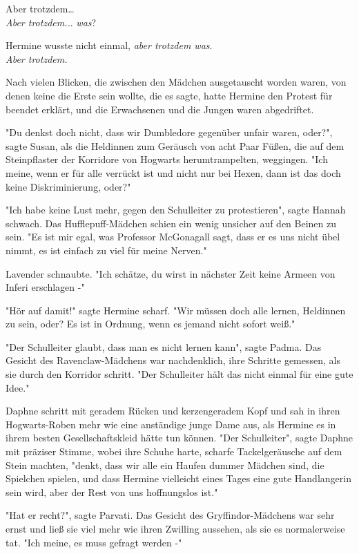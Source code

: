 {Aber trotzdem…\\ \emph{Aber trotzdem..}. \emph{was}?

Hermine wusste nicht einmal, \emph{aber trotzdem was}.\\ \emph{Aber trotzdem.}

Nach vielen Blicken, die zwischen den Mädchen ausgetauscht worden waren, von denen keine die Erste sein wollte, die es sagte, hatte Hermine den Protest für beendet erklärt, und die Erwachsenen und die Jungen waren abgedriftet.

"Du denkst doch nicht, dass wir Dumbledore gegenüber unfair waren, oder?", sagte Susan, als die Heldinnen zum Geräusch von acht Paar Füßen, die auf dem Steinpflaster der Korridore von Hogwarts herumtrampelten, weggingen. "Ich meine, wenn er für alle verrückt ist und nicht nur bei Hexen, dann ist das doch keine Diskriminierung, oder?"

"Ich habe keine Lust mehr, gegen den Schulleiter zu protestieren", sagte Hannah schwach. Das Hufflepuff-Mädchen schien ein wenig unsicher auf den Beinen zu sein. "Es ist mir egal, was Professor McGonagall sagt, dass er es uns nicht übel nimmt, es ist einfach zu viel für meine Nerven."

Lavender schnaubte. "Ich schätze, du wirst in nächster Zeit keine Armeen von Inferi erschlagen -"

"Hör auf damit!" sagte Hermine scharf. "Wir müssen doch alle lernen, Heldinnen zu sein, oder? Es ist in Ordnung, wenn es jemand nicht sofort weiß."

"Der Schulleiter glaubt, dass man es nicht lernen kann", sagte Padma. Das Gesicht des Ravenclaw-Mädchens war nachdenklich, ihre Schritte gemessen, als sie durch den Korridor schritt. "Der Schulleiter hält das nicht einmal für eine gute Idee."

Daphne schritt mit geradem Rücken und kerzengeradem Kopf und sah in ihren Hogwarts-Roben mehr wie eine anständige junge Dame aus, als Hermine es in ihrem besten Gesellschaftskleid hätte tun können. "Der Schulleiter", sagte Daphne mit präziser Stimme, wobei ihre Schuhe harte, scharfe Tackelgeräusche auf dem Stein machten, "denkt, dass wir alle ein Haufen dummer Mädchen sind, die Spielchen spielen, und dass Hermine vielleicht eines Tages eine gute Handlangerin sein wird, aber der Rest von uns hoffnungslos ist."

"Hat er recht?", sagte Parvati. Das Gesicht des Gryffindor-Mädchens war sehr ernst und ließ sie viel mehr wie ihren Zwilling aussehen, als sie es normalerweise tat. "Ich meine, es muss gefragt werden -"

}
